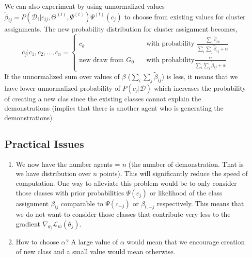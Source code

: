 \documentclass{article}[11pt]
\begin{document}
We can also experiment by using unnormalized values $\tilde{\beta}_{ij} = P(\mathcal{D}_i| c_{ij},\Theta^{(t)},\Psi^{(t)})\Psi^{(t)}(c_{j})$ to choose from existing values for cluster assignments. The new probability distribution for cluster assignment becomes, 
\[   
c_j | c_1, c_2 ,..., c_n = 
     \begin{cases}
       c_k  &\quad\text{with probability } \frac{\sum_{i} \tilde{\beta}_{ik}}{\sum_{i}\sum_j \tilde{\beta}_{ij} +\alpha}\\
       \text{new draw from }G_0 &\quad\text{with probability} \frac{\alpha}{\sum_{i}\sum_j \tilde{\beta}_{ij} +\alpha}
     \end{cases}
\] If the unnormalized sum over values of $\beta$ ($\sum_{i}\sum_j \tilde{\beta}_{ij}$) is less, it means that we have lower unnormalized probability of $P(c_j | \mathcal{D})$ which increases the probability of creating a new clas since the existing classes cannot explain the demonstrations (implies that there is another agent who is generating the demonstrations)


\subsection{Practical Issues}
\begin{enumerate}
\item We now have the number agents = $n$ (the number of demonstration. That is we have distribution over $n$ points). This will significantly reduce the speed of computation. One way to alleviate this problem would be to only consider those classes with prior probabilities $\Psi(c_j)$ or likelihood of the class assignment $\beta_{ij}$ comparable to  $\Psi(c_{-j})$ or $\beta_{i,-j}$ respectively. This means that we do not want to consider those classes that contribute very less to the gradient $\nabla_{\theta_j}\mathcal{L}_m(\theta_j)$.
\item How to choose $\alpha$? A large value of $\alpha$ would mean that we encourage creation of new class and a small value would mean otherwise.

\end{enumerate} 



\end{document}
